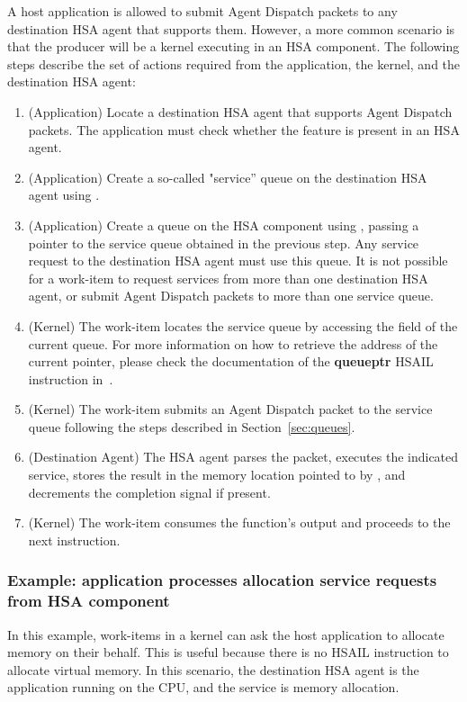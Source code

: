 \documentclass[final,oneside]{book}
\newcommand{\reffun}[1]{\textbf{#1}}
\newcommand{\refhsl}[1]{\reffun{#1}}
\begin{document}
A host application is allowed to submit Agent Dispatch packets to any
destination HSA agent that supports them. However, a more common scenario is
that the producer will be a kernel executing in an HSA component. The following
steps describe the set of actions required from the application, the kernel, and
the destination HSA agent:
\begin{enumerate}[itemsep=1pt,topsep=3pt,partopsep=0pt]
\item (Application) Locate a destination HSA agent that supports Agent Dispatch
  packets. The application must check whether the feature
   is present in an HSA agent.
\item (Application) Create a so-called "service'' queue on the destination HSA
  agent using .
\item (Application) Create a queue on the HSA component using
  , passing a pointer to the service queue obtained in
  the previous step.  Any service request to the destination HSA agent must use
  this queue. It is not possible for a work-item to request services from more
  than one destination HSA agent, or submit Agent Dispatch packets to more than
  one service queue.
\item (Kernel) The work-item locates the service queue by accessing the
   field of the current queue. For more
  information on how to retrieve the address of the current pointer, please
  check the documentation of the \refhsl{queueptr} HSAIL instruction
  in~\cite{prm}.
\item (Kernel) The work-item submits an Agent Dispatch packet to the service
  queue following the steps described in Section~\ref{sec:queues}.
\item (Destination Agent) The HSA agent parses the packet, executes the
  indicated service, stores the result in the memory location pointed to by
  , and decrements the
  completion signal if present.
\item (Kernel) The work-item consumes the function's output and proceeds to the
  next instruction.
\end{enumerate}

\subsubsection{Example: application processes allocation service requests from
  HSA component}
In this example, work-items in a kernel can ask the host application to
allocate memory on their behalf. This is useful because there is no HSAIL
instruction to allocate virtual memory. In this scenario, the destination HSA
agent is the application running on the CPU, and the service is memory
allocation.
\end{document}
